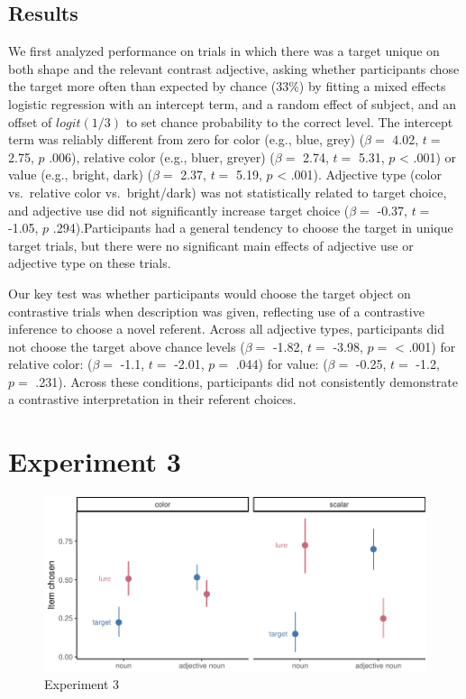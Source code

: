 \documentclass[10pt, letterpaper]{article}
\newenvironment{CodeChunk}{}{}
\begin{document}
\subsection{Results}\label{results-1}

We first analyzed performance on trials in which there was a target
unique on both shape and the relevant contrast adjective, asking whether
participants chose the target more often than expected by chance
(\(33\%\)) by fitting a mixed effects logistic regression with an
intercept term, and a random effect of subject, and an offset of
\(logit(1/3)\) to set chance probability to the correct level. The
intercept term was reliably different from zero for color (e.g., blue,
grey) (\(\beta =\) 4.02, \(t =\) 2.75, \(p\) .006), relative color
(e.g., bluer, greyer) (\(\beta =\) 2.74, \(t =\) 5.31, \(p\) \textless{}
.001) or value (e.g., bright, dark) (\(\beta =\) 2.37, \(t =\) 5.19,
\(p\) \textless{} .001). Adjective type (color vs.~relative color
vs.~bright/dark) was not statistically related to target choice, and
adjective use did not significantly increase target choice (\(\beta =\)
-0.37, \(t =\) -1.05, \(p\) .294).Participants had a general tendency to
choose the target in unique target trials, but there were no significant
main effects of adjective use or adjective type on these trials.

Our key test was whether participants would choose the target object on
contrastive trials when description was given, reflecting use of a
contrastive inference to choose a novel referent. Across all adjective
types, participants did not choose the target above chance levels
(\(\beta =\) -1.82, \(t =\) -3.98, \(p =\) \textless{} .001) for
relative color: (\(\beta =\) -1.1, \(t =\) -2.01, \(p =\) .044) for
value: (\(\beta =\) -0.25, \(t =\) -1.2, \(p =\) .231). Across these
conditions, participants did not consistently demonstrate a contrastive
interpretation in their referent choices.

\section{Experiment 3}\label{experiment-3}

\begin{CodeChunk}
\begin{figure}[tb]

{\centering \includegraphics{figs/e3_fig-1} 

}

\caption[Experiment 3]{Experiment 3}\label{fig:e3_fig}
\end{figure}
\end{CodeChunk}
\end{document}

